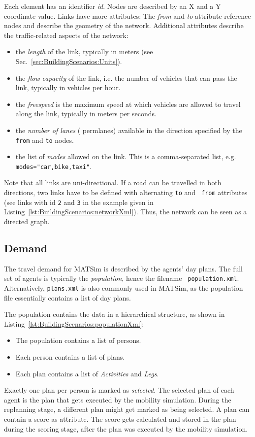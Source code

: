 Each element has an identifier \emph{id}. Nodes are described by an X and a Y
coordinate value. Links have more attributes: The \emph{from} and \emph{to}
attribute reference nodes and describe the geometry of the network. Additional
attributes describe the traffic-related aspects of the network:
\begin{itemize}\styleItemize
  \item the \emph{length} of the link, typically in meters (see
  Sec.~\ref{sec:BuildingScenarios:Units}).
  \item the \emph{flow capacity} of the link, i.e. the number of vehicles that
  can pass the link, typically in vehicles per hour.
  \item the \emph{freespeed} is the maximum speed at which vehicles are allowed
  to travel along the link, typically in meters per seconds.
  \item the \emph{number of lanes} ({\tt} permlanes) available in the direction
  specified by the {\tt from} and {\tt to} nodes.
  \item the list of \emph{modes} allowed on the link. This is a comma-separated
  list, e.g. {\tt modes="car,bike,taxi"}.
\end{itemize}
Note that all links are uni-directional. If a road can be travelled in both
directions, two links have to be defined with alternating {\tt to} and {\tt
from} attributes (see links with id {\tt 2} and {\tt 3} in the example given in
Listing~\ref{lst:BuildingScenarios:networkXml}).
Thus, the network can be seen as a directed graph.

\subsection{Demand}

The travel demand for MATSim is described by the agents' day plans. The full set
of agents is typically the \emph{population}, hence the filename {\tt
population.xml}. Alternatively, {\tt plans.xml} is also commonly used in MATSim,
as the population file essentially contains a list of day plans.

The population contains the data in a hierarchical structure, as shown in
Listing~\ref{lst:BuildingScenarios:populationXml}:
\begin{itemize}\styleItemize
  \item The population contains a list of persons.
  \item Each person contains a list of plans.
  \item Each plan contains a list of \emph{Activities} and \emph{Legs}.
\end{itemize}
Exactly one plan per person is marked as \emph{selected}. The selected plan of
each agent is the plan that gets executed by the mobility simulation. During the
replanning stage, a different plan might get marked as being selected. A plan
can contain a score as attribute. The score gets calculated and stored in the
plan during the scoring stage, after the plan was executed by the mobility
simulation.


